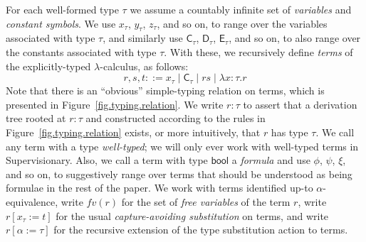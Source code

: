 \documentclass[a4paper, UKenglish, cleveref, autoref, thm-restate, colorlinks]{lipics-v2021}
\newcommand{\lam}[1]{\lambda{#1}.}
\begin{document}
For each well-formed type $\tau$ we assume a countably infinite set of \emph{variables} and \emph{constant symbols}.
We use $x_\tau$, $y_\tau$, $z_\tau$, and so on, to range over the variables associated with type $\tau$, and similarly use $\mathsf{C}_\tau$, $\mathsf{D}_\tau$, $\mathsf{E}_\tau$, and so on, to also range over the constants associated with type $\tau$.
With these, we recursively define \emph{terms} of the explicitly-typed $\lambda$-calculus, as follows:
\begin{displaymath}
r, s, t ::= x_\tau \mid \mathsf{C}_\tau \mid rs \mid \lam{x{:}\tau}r
\end{displaymath}
Note that there is an ``obvious'' simple-typing relation on terms, which is presented in Figure~\ref{fig.typing.relation}.
We write $r : \tau$ to assert that a derivation tree rooted at $r : \tau$ and constructed according to the rules in Figure~\ref{fig.typing.relation} exists, or more intuitively, that $r$ has type $\tau$.
We call any term with a type \emph{well-typed}; we will only ever work with well-typed terms in Supervisionary.
Also, we call a term with type $\mathsf{bool}$ a \emph{formula} and use $\phi$, $\psi$, $\xi$, and so on, to suggestively range over terms that should be understood as being formulae in the rest of the paper.
We work with terms identified up-to $\alpha$-equivalence, write $fv(r)$ for the set of \emph{free variables} of the term $r$, write $r[x_\tau := t]$ for the usual \emph{capture-avoiding substitution} on terms, and write $r[\alpha := \tau]$ for the recursive extension of the type substitution action to terms.
\end{document}
